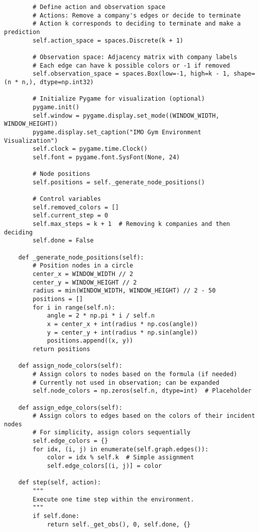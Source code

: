 \begin{lstlisting}
        # Define action and observation space
        # Actions: Remove a company's edges or decide to terminate
        # Action k corresponds to deciding to terminate and make a prediction
        self.action_space = spaces.Discrete(k + 1)

        # Observation space: Adjacency matrix with company labels
        # Each edge can have k possible colors or -1 if removed
        self.observation_space = spaces.Box(low=-1, high=k - 1, shape=(n * n,), dtype=np.int32)

        # Initialize Pygame for visualization (optional)
        pygame.init()
        self.window = pygame.display.set_mode((WINDOW_WIDTH, WINDOW_HEIGHT))
        pygame.display.set_caption("IMO Gym Environment Visualization")
        self.clock = pygame.time.Clock()
        self.font = pygame.font.SysFont(None, 24)

        # Node positions
        self.positions = self._generate_node_positions()

        # Control variables
        self.removed_colors = []
        self.current_step = 0
        self.max_steps = k + 1  # Removing k companies and then deciding
        self.done = False

    def _generate_node_positions(self):
        # Position nodes in a circle
        center_x = WINDOW_WIDTH // 2
        center_y = WINDOW_HEIGHT // 2
        radius = min(WINDOW_WIDTH, WINDOW_HEIGHT) // 2 - 50
        positions = []
        for i in range(self.n):
            angle = 2 * np.pi * i / self.n
            x = center_x + int(radius * np.cos(angle))
            y = center_y + int(radius * np.sin(angle))
            positions.append((x, y))
        return positions

    def assign_node_colors(self):
        # Assign colors to nodes based on the formula (if needed)
        # Currently not used in observation; can be expanded
        self.node_colors = np.zeros(self.n, dtype=int)  # Placeholder

    def assign_edge_colors(self):
        # Assign colors to edges based on the colors of their incident nodes
        # For simplicity, assign colors sequentially
        self.edge_colors = {}
        for idx, (i, j) in enumerate(self.graph.edges()):
            color = idx % self.k  # Simple assignment
            self.edge_colors[(i, j)] = color

    def step(self, action):
        """
        Execute one time step within the environment.
        """
        if self.done:
            return self._get_obs(), 0, self.done, {}


\end{lstlisting}
